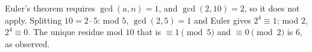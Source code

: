 Euler's theorem requires $\gcd(a,n)=1$, and $\gcd(2,10)=2$, so it does not apply. Splitting $10=2\cdot5$: mod $5$, $\gcd(2,5)=1$ and Euler gives $2^4\equiv1$; mod $2$, $2^4\equiv0$. The unique residue mod $10$ that is $\equiv1\pmod5$ and $\equiv0\pmod2$ is $\boxed{6}$, as observed.
